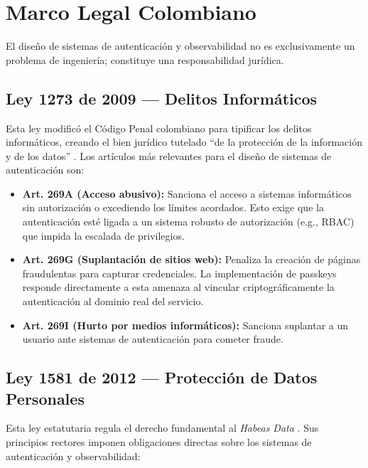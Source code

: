 \documentclass[12pt, a4paper]{article}
\begin{document}
\section{Marco Legal Colombiano}

El diseño de sistemas de autenticación y observabilidad no es exclusivamente
un problema de ingeniería; constituye una responsabilidad jurídica.

\subsection{Ley 1273 de 2009 --- Delitos Informáticos}

Esta ley modificó el Código Penal colombiano para tipificar los delitos
informáticos, creando el bien jurídico tutelado ``de la protección de la
información y de los datos'' \cite{ley1273}. Los artículos más relevantes para
el diseño de sistemas de autenticación son:

\begin{itemize}[noitemsep]
  \item \textbf{Art. 269A (Acceso abusivo):} Sanciona el acceso a sistemas
        informáticos sin autorización o excediendo los límites acordados. Esto
        exige que la autenticación esté ligada a un sistema robusto de
        autorización (e.g., RBAC) que impida la escalada de privilegios.
  \item \textbf{Art. 269G (Suplantación de sitios web):} Penaliza la creación
        de páginas fraudulentas para capturar credenciales. La implementación
        de passkeys responde directamente a esta amenaza al vincular
        criptográficamente la autenticación al dominio real del servicio.
  \item \textbf{Art. 269I (Hurto por medios informáticos):} Sanciona suplantar
        a un usuario ante sistemas de autenticación para cometer fraude.
\end{itemize}

\subsection{Ley 1581 de 2012 --- Protección de Datos Personales}

Esta ley estatutaria regula el derecho fundamental al \textit{Habeas Data}
\cite{ley1581}. Sus principios rectores imponen obligaciones directas sobre los
sistemas de autenticación y observabilidad:
\end{document}
